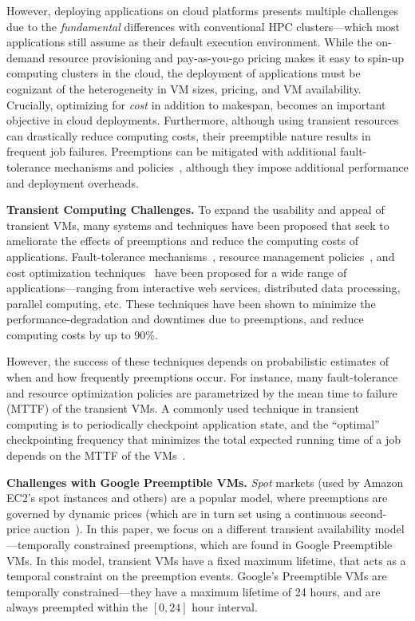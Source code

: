 However, deploying applications on cloud platforms presents multiple challenges due to the  \emph{fundamental} differences with conventional HPC clusters---which most applications still assume as their default execution environment.
%
While the on-demand resource provisioning and pay-as-you-go pricing makes it easy to spin-up computing clusters in the cloud, the deployment of applications must be cognizant of the heterogeneity in VM sizes, pricing, and VM availability. 
%
Crucially, optimizing for \emph{cost} in addition to makespan,  becomes an important objective in cloud deployments. 
% 
Furthermore, although using transient resources can drastically reduce computing costs, their preemptible nature results in frequent job failures. 
%
Preemptions can be mitigated with additional fault-tolerance mechanisms and policies~\cite{flint, marathe2014exploiting}, although they impose additional performance and deployment overheads. 

\noindent \textbf{Transient Computing Challenges.}
To expand the usability and appeal of transient VMs, many systems and techniques have been proposed that seek to ameliorate the effects of preemptions and reduce the computing costs of applications. 
%
Fault-tolerance mechanisms~\cite{spotcheck, marathe2014exploiting}, resource management policies~\cite{exosphere, conductor}, and cost optimization techniques~\cite{dubois2016optispot, shastri2017hotspot} have been proposed for a wide range of applications---ranging from interactive web services, distributed data processing, parallel computing, etc.
%
These techniques have been shown to minimize the performance-degradation and downtimes due to preemptions, and reduce computing costs by up to 90\%. 


However, the success of these techniques depends on probabilistic estimates of when and how frequently preemptions occur. 
For instance, many fault-tolerance and resource optimization policies are parametrized by the mean time to failure (MTTF) of the transient VMs. 
A commonly used technique in transient computing is 
to periodically checkpoint application state, and the ``optimal'' checkpointing frequency that minimizes the total expected running time of a job depends on the MTTF of the VMs~\cite{daly2006higher}. 


\noindent \textbf{Challenges with Google Preemptible VMs.}
\emph{Spot} markets (used by Amazon EC2's spot instances and others) are a popular model, where preemptions are governed by dynamic prices (which are in turn set using a continuous second-price auction~\cite{spot-pricing2}). 
%
In this paper, we focus on a different transient availability model---temporally constrained preemptions, which are found in Google Preemptible VMs. 
%
In this model, transient VMs have a fixed maximum lifetime, that acts as a temporal constraint on the preemption events. 
%
Google's Preemptible VMs are temporally constrained---they have a maximum lifetime of 24 hours, and are always preempted within the $[0,24]$ hour interval.




